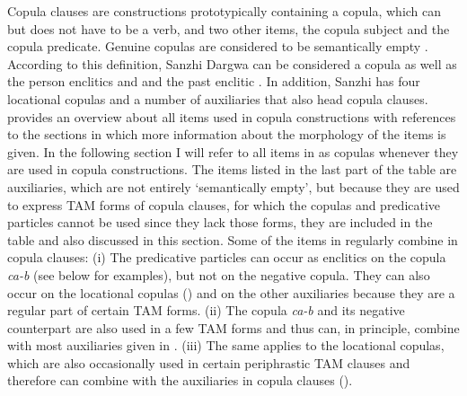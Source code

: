 Copula clauses are constructions prototypically containing a copula, which can but does not have to be a verb, and two other items, the copula subject and the copula predicate. Genuine copulas are considered to be semantically empty \citep[5]{Pustet2005}. According to this definition, Sanzhi Dargwa  can be considered a copula as well as the person enclitics  and  and the past enclitic . In addition, Sanzhi has four locational copulas and a number of auxiliaries that also head copula clauses.  provides an overview about all items used in copula constructions with references to the sections in which more information about the morphology of the items is given. In the following section I will refer to all items in  as copulas whenever they are used in copula constructions. The items listed in the last part of the table are auxiliaries, which are not entirely `semantically empty', but because they are used to express TAM forms of copula clauses, for which the copulas and predicative particles cannot be used since they lack those forms, they are included in the table and also discussed in this section. Some of the items in  regularly combine in copula clauses: (i) The predicative particles can occur as enclitics on the copula \textit{ca-b} (see below for examples), but not on the negative copula. They can also occur on the locational copulas () and on the other auxiliaries because they are a regular part of certain TAM forms. (ii) The copula \textit{ca-b} and its negative counterpart are also used in a few TAM forms and thus can, in principle, combine with most auxiliaries given in  . (iii) The same applies to the locational copulas, which are also occasionally used in certain periphrastic TAM clauses and therefore can combine with the auxiliaries in copula clauses ().

